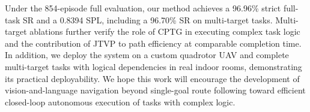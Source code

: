 \documentclass[letterpaper,10pt,journal]{IEEEtran}
\begin{document}
Under the 854-episode full evaluation, our method achieves a 96.96\% strict full-task SR and a 0.8394 SPL, including a 96.70\% SR on multi-target tasks. Multi-target ablations further verify the role of CPTG in executing complex task logic and the contribution of JTVP to path efficiency at comparable completion time. In addition, we deploy the system on a custom quadrotor UAV and complete multi-target tasks with logical dependencies in real indoor rooms, demonstrating its practical deployability. We hope this work will encourage the development of vision-and-language navigation beyond single-goal route following toward efficient closed-loop autonomous execution of tasks with complex logic.


\end{document}

